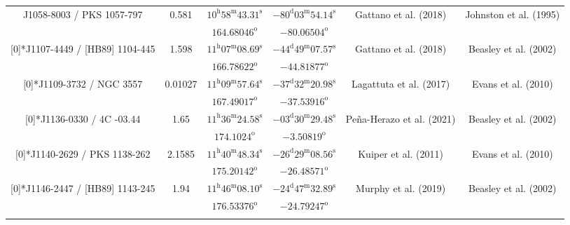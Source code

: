 \begin{landscape}
\begin{longtable}{cccccc}
  \multirow{2}[0]{*}{J1058-8003 / PKS 1057-797} & \multirow{2}[0]{*}{0.581} &  
    $10^\text{h}58^\text{m}43.31^\text{s}$  & $ -80^\text{d}03^\text{m}54.14^\text{s}$  & 
    \multirow{2}[0]{*}{Gattano et al. (2018)\cite{RedRef5_2018}}& \multirow{2}[0]{*}{Johnston et al. (1995)\cite{CoordRef0_1995}} \\*
     & & $164.68046^\text{o}$ & $-80.06504^\text{o}$ & & \\ \addlinespace 

  \multirow{2}[0]{*}{J1107-4449 / [HB89] 1104-445} & \multirow{2}[0]{*}{1.598} &  
    $11^\text{h}07^\text{m}08.69^\text{s}$  & $ -44^\text{d}49^\text{m}07.57^\text{s}$  & 
    \multirow{2}[0]{*}{Gattano et al. (2018)\cite{RedRef5_2018}}& \multirow{2}[0]{*}{Beasley et al. (2002)\cite{CoordRef4_2002}} \\*
    & & $166.78622^\text{o}$ & $-44.81877^\text{o}$ & & \\ \addlinespace 
  \multirow{2}[0]{*}{J1109-3732 / NGC 3557} & \multirow{2}[0]{*}{0.01027} &  
    $11^\text{h}09^\text{m}57.64^\text{s}$  & $-37^\text{d}32^\text{m}20.98^\text{s}$  & 
    \multirow{2}[0]{*}{Lagattuta et al. (2017)\cite{RedRef43_2017}}& \multirow{2}[0]{*}{Evans et al. (2010)\cite{CoordRef1_2010}} \\*
    & & $167.49017^\text{o}$ & $-37.53916^\text{o}$ & & \\ \addlinespace 
  \multirow{2}[0]{*}{J1136-0330 / 4C -03.44} & \multirow{2}[0]{*}{1.65} &  
    $11^\text{h}36^\text{m}24.58^\text{s}$  & $-03^\text{d}30^\text{m}29.48^\text{s}$  & 
    \multirow{2}[0]{*}{Pe{\~n}a-Herazo et al. (2021)\cite{RedRef44_2021}}& \multirow{2}[0]{*}{Beasley et al. (2002)\cite{CoordRef4_2002}} \\*
    & & $174.1024^\text{o}$ & $-3.50819^\text{o}$ & & \\ \addlinespace 
   \multirow{2}[0]{*}{J1140-2629 / PKS 1138-262} & \multirow{2}[0]{*}{2.1585} &  
    $11^\text{h}40^\text{m}48.34^\text{s} $  & $-26^\text{d}29^\text{m}08.56^\text{s} $  & 
    \multirow{2}[0]{*}{Kuiper et al. (2011)\cite{RedRef45_2011}}& \multirow{2}[0]{*}{Evans et al. (2010)\cite{CoordRef1_2010}} \\*
    & & $175.20142^\text{o}$ & $-26.48571^\text{o}$ & & \\ \addlinespace 
   \multirow{2}[0]{*}{J1146-2447 / [HB89] 1143-245} & \multirow{2}[0]{*}{1.94} &  
    $11^\text{h}46^\text{m}08.10^\text{s}$  & $-24^\text{d}47^\text{m}32.89^\text{s}$  & 
    \multirow{2}[0]{*}{Murphy et al. (2019)\cite{RedRef46_2019}}& \multirow{2}[0]{*}{Beasley et al. (2002)\cite{CoordRef4_2002}} \\*
     & & $176.53376^\text{o}$ & $-24.79247^\text{o}$ & & \\ \addlinespace 


\end{longtable}
\end{landscape}
